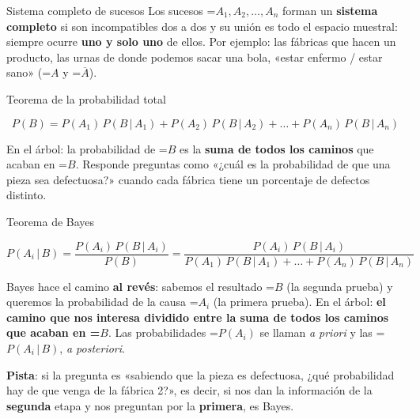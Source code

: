 \documentclass[11pt,a4paper]{article}
\newcommand{\fmm}[1]{\setbox0=\hbox{$#1$}\ifdim\wd0>\linewidth\[#1\]\else\mbox{\box0}\fi}
\newcommand{\fmuline}[1]{\textbf{\color{fmaccent}#1}}
\begin{document}
  
\begin{fmdef}{Sistema completo de sucesos}
Los sucesos \fmm{A_1, A_2,\dots,A_n} forman un \textbf{sistema completo} si son incompatibles dos a dos y su unión es todo el espacio muestral: siempre ocurre \textbf{uno y solo uno} de ellos. Por ejemplo: las fábricas que hacen un producto, las urnas de donde podemos sacar una bola, «estar enfermo / estar sano» (\fmm{A} y \fmm{\overline{A}}).
\end{fmdef}

  
\begin{fmprop}{Teorema de la probabilidad total}

\[P(B)=P(A_1)\,P(B\,|\,A_1)+P(A_2)\,P(B\,|\,A_2)+\dots+P(A_n)\,P(B\,|\,A_n)\]

      

En el árbol: la probabilidad de \fmm{B} es la \textbf{suma de todos los caminos} que acaban en \fmm{B}. Responde preguntas como «¿cuál es la probabilidad de que una pieza sea defectuosa?» cuando cada fábrica tiene un porcentaje de defectos distinto.
\end{fmprop}

  
\begin{fmprop}{Teorema de Bayes}

\[P(A_i\,|\,B)=\frac{P(A_i)\,P(B\,|\,A_i)}{P(B)}=\frac{P(A_i)\,P(B\,|\,A_i)}{P(A_1)\,P(B\,|\,A_1)+\dots+P(A_n)\,P(B\,|\,A_n)}\]

      

Bayes hace el camino \textbf{al revés}: sabemos el resultado \fmm{B} (la segunda prueba) y queremos la probabilidad de la causa \fmm{A_i} (la primera prueba). En el árbol: \textbf{el camino que nos interesa dividido entre la suma de todos los caminos que acaban en \fmm{B}}. Las probabilidades \fmm{P(A_i)} se llaman \emph{a priori} y las \fmm{P(A_i\,|\,B)}, \emph{a posteriori}.

      
\begin{fmnote}\fmuline{Pista}: si la pregunta es «sabiendo que la pieza es defectuosa, ¿qué probabilidad hay de que venga de la fábrica 2?», es decir, si nos dan la información de la \textbf{segunda} etapa y nos preguntan por la \textbf{primera}, es Bayes.\end{fmnote}
\end{fmprop}
\end{document}
